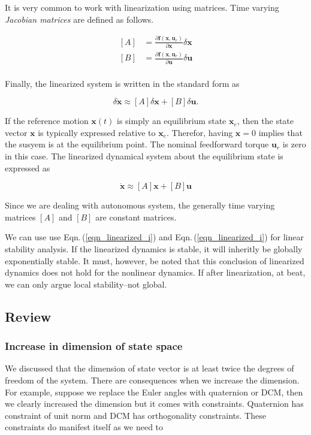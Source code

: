 \documentclass{article}
\begin{document}
It is very common to work with linearization using matrices. Time varying \textit{Jacobian matrices} are defined as follows.

\begin{equation*}
  \begin{split}
    [A] &= \frac{\partial\bm{f}(\bm{x},\bm{u}_{r})}{\partial\bm{x}}\delta\bm{x}\\ 
    [B] &= \frac{\partial\bm{f}(\bm{x},\bm{u}_{r})}{\partial\bm{u}}\delta\bm{u}\\ 
  \end{split}
\end{equation*}

Finally, the linearized system is written in the standard form as

\begin{equation}
  \label{eqn_linearized_i}
  \delta\dot{\bm{x}}\approx[A]\delta\bm{x} + [B]\delta\bm{u}.
\end{equation}

If the reference motion $\bm{x}(t)$ is simply an equilibrium state $\bm{x}_{e}$, then the state vector $\bm{x}$ is typically expressed relative to $\bm{x}_{e}$. Therefor, having $\bm{x}=0$ implies 
that the susyem is at the equilibrium point. The nominal feedforward torque $\bm{u}_{r}$ is zero in this case. The linearized dynamical system about the equilibrium state is expressed as

\begin{equation}
\label{eqn_linearized_ii}
\dot{\bm{x}}\approx[A]\bm{x}+[B]\bm{u}
\end{equation}

Since we are dealing with autonomous system, the generally time varying matrices $[A]$ and $[B]$ are constant matrices.

We can use use Eqn.\,(\ref{eqn_linearized_i}) and Eqn.\,(\ref{eqn_linearized_i}) for linear stability analysis. If the linearized dynamics is stable, it will inheritly be globally exponentially stable. It must, however, be noted that this conclusion of linearized dynamics does not hold for the nonlinear dynamics. If after linearization, at beat, we can only argue local stability--not global.

\subsection{Review}
\subsubsection*{Increase in dimension of state space}
We discussed that the dimension of state vector is at least twice the degrees of freedom of the system. There are consequences when we increase the dimension. For example, suppose we replace the Euler angles with quaternion or DCM, then we clearly increased the dimension but it comes with constraints. Quaternion has constraint of unit norm and DCM has orthogonality constraints. These constraints do manifest itself as we need to
\end{document}
